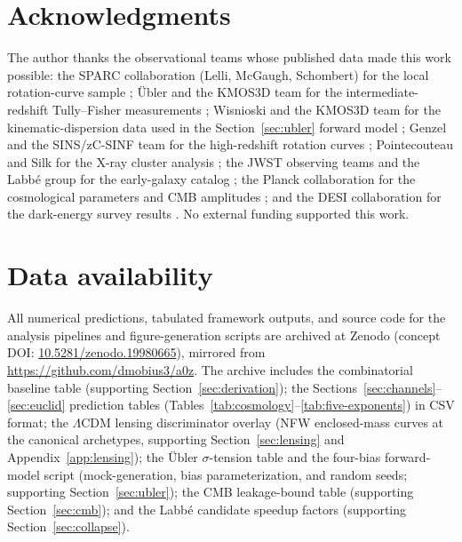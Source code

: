 \documentclass[11pt,a4paper]{article}
\numberwithin{equation}{section}
\numberwithin{table}{section}
\numberwithin{figure}{section}
\begin{document}
\section*{Acknowledgments}

The author thanks the observational teams whose published data made
this work possible: the SPARC collaboration (Lelli, McGaugh,
Schombert) for the local rotation-curve sample
\citep{Lelli2016,McGaugh2016}; {\"U}bler and the KMOS3D team for the
intermediate-redshift Tully--Fisher measurements \citep{Ubler2017};
Wisnioski and the KMOS3D team for the kinematic-dispersion data used
in the Section~\ref{sec:ubler} forward model \citep{Wisnioski2015};
Genzel and the SINS/zC-SINF team for the high-redshift rotation curves
\citep{Genzel2017}; Pointecouteau and Silk for the X-ray cluster
analysis \citep{Pointecouteau2005}; the JWST observing teams and the
Labb{\'e} group for the early-galaxy catalog \citep{Labbe2023}; the
Planck collaboration for the cosmological parameters and CMB
amplitudes \citep{Planck2018}; and the DESI collaboration for the
dark-energy survey results \citep{DESI2025}. No external funding
supported this work.

\section*{Data availability}

All numerical predictions, tabulated framework outputs, and source
code for the analysis pipelines and figure-generation scripts are
archived at Zenodo (concept DOI:
\href{https://doi.org/10.5281/zenodo.19980665}{10.5281/zenodo.19980665}),
mirrored from \url{https://github.com/dmobius3/a0z}. The archive
includes the combinatorial baseline table (supporting
Section~\ref{sec:derivation}); the
Sections~\ref{sec:channels}--\ref{sec:euclid} prediction tables
(Tables~\ref{tab:cosmology}--\ref{tab:five-exponents}) in CSV format;
the $\Lambda$CDM lensing discriminator overlay (NFW enclosed-mass
curves at the canonical archetypes, supporting
Section~\ref{sec:lensing} and Appendix~\ref{app:lensing}); the
{\"U}bler $\sigma$-tension table and the four-bias forward-model
script (mock-generation, bias parameterization, and random seeds;
supporting Section~\ref{sec:ubler}); the CMB leakage-bound table
(supporting Section~\ref{sec:cmb}); and the Labb{\'e} candidate
speedup factors (supporting Section~\ref{sec:collapse}).

\end{document}

